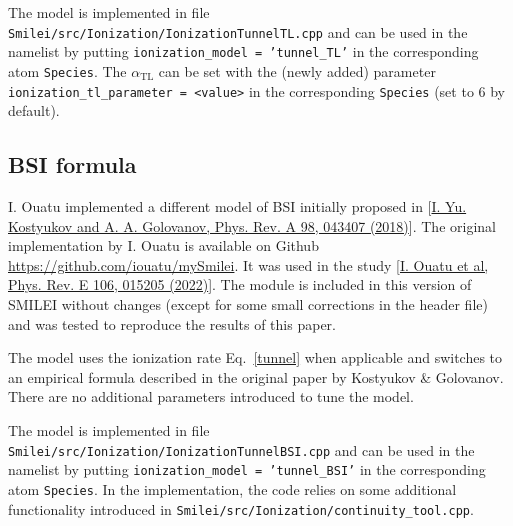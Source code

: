 \documentclass[prd, preprint,
aps,
amsmath,
amssymb,
onecolumn,
nofootinbib,
superscriptaddress,
]{revtex4-2}
\begin{document}
	The model is implemented in file \texttt{Smilei/src/Ionization/IonizationTunnelTL.cpp} and can be used in the namelist by putting \texttt{ionization\_model = 'tunnel\_TL'} in the corresponding atom \texttt{Species}. The $\alpha_{\text{TL}}$ can be set with the (newly added) parameter \texttt{ionization\_tl\_parameter = <value>} in the corresponding \texttt{Species}
	(set to 6 by default).
	
	
	\clearpage
	\subsection{BSI formula}
	I. Ouatu implemented a different model of BSI initially proposed in [\href{https://journals.aps.org/pra/abstract/10.1103/PhysRevA.98.043407}{I. Yu. Kostyukov and A. A. Golovanov, Phys. Rev. A 98, 043407 (2018)}]. The original implementation by I. Ouatu is available on Github \url{https://github.com/iouatu/mySmilei}. It was used in the study [\href{https://journals.aps.org/pre/abstract/10.1103/PhysRevE.106.015205}{I. Ouatu et al,
		Phys. Rev. E 106, 015205 (2022)}]. The module is included in this version of SMILEI without changes (except for some small corrections in the header file) and was tested to reproduce the results of this paper.
	
	The model uses the ionization rate Eq.~\eqref{tunnel} when applicable and switches to an empirical formula described in the original paper by Kostyukov \& Golovanov. There are no additional parameters introduced to tune the model. 
	
	The model is implemented in file \texttt{Smilei/src/Ionization/IonizationTunnelBSI.cpp} and can be used in the namelist by putting \texttt{ionization\_model = 'tunnel\_BSI'} in the corresponding atom \texttt{Species}. In the implementation, the code relies on some additional functionality introduced in \texttt{Smilei/src/Ionization/continuity\_tool.cpp}.
	
	
\end{document}
